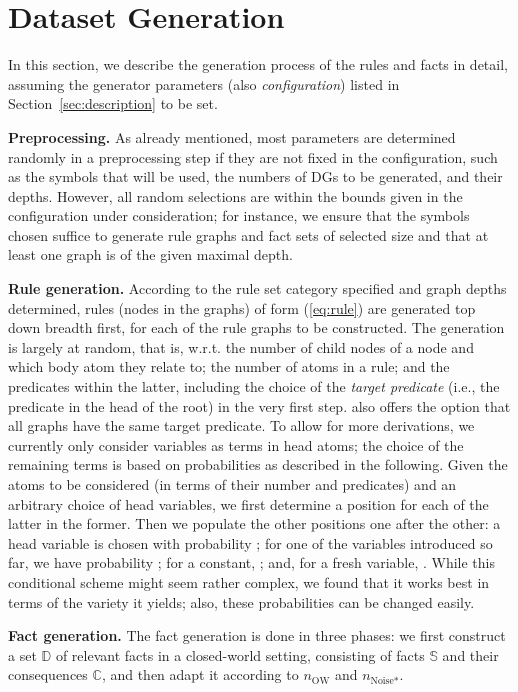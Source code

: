 \documentclass[letterpaper]{article} \usepackage{aaai20}  \usepackage{times}  \usepackage{helvet} \usepackage{courier}  \usepackage[hyphens]{url}  \usepackage{graphicx} \urlstyle{rm} \def\UrlFont{\rm}  \usepackage{graphicx}  \frenchspacing  \setlength{\pdfpagewidth}{8.5in}  \setlength{\pdfpageheight}{11in}  \usepackage{amsthm}
\theoremstyle{definition}
\newcommand{\support}{\text{support}\xspace}
\newcommand{\tool}{\text{RuDaS}\xspace}
\newcommand{\nowa}{\ensuremath{n_{\text{OW}}}\xspace}
\newcommand{\nnoise}{\ensuremath{n_{\text{Noise*}}}\xspace}
\newcommand{\db}{\ensuremath{\mathbb{D}}\xspace}\newcommand{\dbowa}{\ensuremath{\db_{\text{OW}}}\xspace}
\newcommand{\sfacts}{\ensuremath{\mathbb{S}}\xspace}
\newcommand{\cfacts}{\ensuremath{\mathbb{C}}\xspace}
\begin{document}
\section{Dataset Generation}\label{sec:generation}

In this section, we describe the generation process of the rules and facts in detail, assuming the generator parameters (also \emph{configuration}) listed in Section~\ref{sec:description} to be set.



\textbf{Preprocessing.}
As already mentioned, most parameters are determined randomly in a preprocessing step if they are not fixed in the configuration, such as the symbols that will be used, the numbers of DGs to be generated, and their depths.
However, all random selections are within the bounds given in the configuration under consideration; for instance,
we ensure that the symbols chosen suffice to generate rule graphs and fact sets of selected size and that at least one graph is of the given maximal depth.

\textbf{Rule generation.}
According to the rule set category specified and graph depths determined, rules (nodes in the graphs) of form (\ref{eq:rule}) are generated top down breadth first, for each of the rule graphs to be constructed. 
The generation is largely at random, that is, w.r.t.
the number of child nodes of a node and which body atom they relate to; 
the number of atoms in a rule; and the predicates within the latter, including the choice of the \emph{target predicate} (i.e., the predicate in the head of the root) in the very first step. \tool also offers the option that all graphs have the same target predicate.
To allow for more derivations, we currently only consider variables as terms in head atoms; the choice of the remaining terms is based on probabilities as described in the following. 
Given the atoms to be considered (in terms of their number and predicates) and an arbitrary choice of head variables, we first determine a position for each of the latter in the former. Then we populate the other positions one after the other: a head variable is chosen with probability ; for one of the variables introduced so far, we have probability ; for a constant, ; and, for a fresh variable, . While this conditional scheme might seem rather complex, we found that it works best in terms of the variety it yields; also, these probabilities can be changed easily.



\textbf{Fact generation.}
The fact generation is done in three phases: we first construct a set \db of relevant facts in a closed-world setting, consisting of {\support facts} \sfacts and their {consequences} \cfacts, and then adapt it according to \nowa and \nnoise. 
\end{document}
